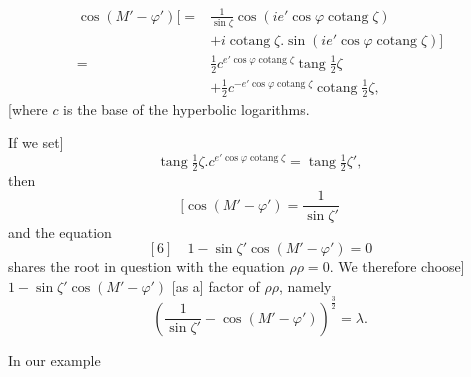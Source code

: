 \[
\begin{aligned}
\cos(M'-\varphi')\bigl[={}&\frac1{\sin\zeta}
 \cos(ie'\cos\varphi\operatorname{cotang}\zeta)\\
&+i\operatorname{cotang}\zeta\mathord{.}
 \sin(ie'\cos\varphi\operatorname{cotang}\zeta)\bigr]\\
={}&\tfrac12c^{e'\cos\varphi\operatorname{cotang}\zeta}\operatorname{tang}\tfrac12\zeta\\
&+\tfrac12c^{-e'\cos\varphi\operatorname{cotang}\zeta}\operatorname{cotang}\tfrac12\zeta,
\end{aligned}
\]
[where \(c\) is the base of the hyperbolic logarithms.
\par\noindent\hspace*{\parindent}If we set]
\[
\operatorname{tang}\tfrac12\zeta\mathord{.}c^{e'\cos\varphi\operatorname{cotang}\zeta}
 =\operatorname{tang}\tfrac12\zeta',
\]
then
\[
[\cos(M'-\varphi')=\frac1{\sin\zeta'}
\]
and the equation
\[
[6]\quad1-\sin\zeta'\cos(M'-\varphi')=0
\]
shares the root in question with the equation \(\rho\rho=0\). We therefore choose]
\(1-\sin\zeta'\cos(M'-\varphi')\) [as a] factor of \(\rho\rho\), namely
\[
\left(\frac1{\sin\zeta'}-\cos(M'-\varphi')\right)^{\frac32}=\lambda.
\]
\par\noindent\hspace*{\parindent}In our example
